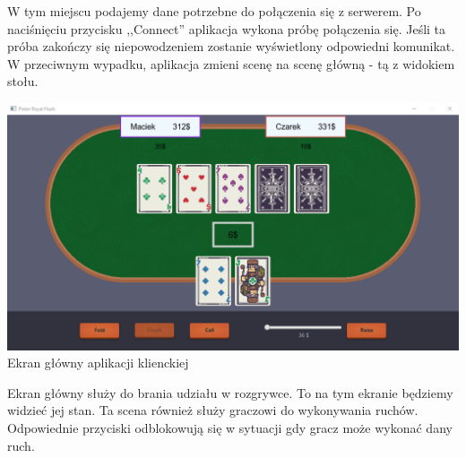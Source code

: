 \documentclass{article}
\begin{document}
        W tym miejscu podajemy dane potrzebne do połączenia się z serwerem.
        Po naciśnięciu przycisku ,,Connect'' aplikacja wykona próbę połączenia się.
        Jeśli ta próba zakończy się niepowodzeniem zostanie wyświetlony odpowiedni komunikat.
        W przeciwnym wypadku, aplikacja zmieni scenę na scenę główną - tą z widokiem stołu.
        
        \vspace{4mm}
        
        \begin{center}
            \includegraphics[width=\textwidth]{ekran_glowny.png}
            \\
            Ekran główny aplikacji klienckiej
        \end{center}
    
        Ekran główny służy do brania udziału w rozgrywce.
        To na tym ekranie będziemy widzieć jej stan.
        Ta scena również służy graczowi do wykonywania ruchów.
        Odpowiednie przyciski odblokowują się w sytuacji gdy gracz może wykonać dany ruch.
       
    
\end{document}
